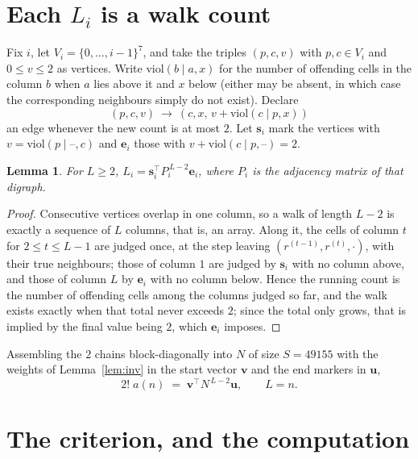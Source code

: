 \documentclass[11pt,a4paper]{article}
\theoremstyle{plain}
\newtheorem{lemma}[theorem]{Lemma}
\theoremstyle{definition}
\begin{document}
\section{Each $L_i$ is a walk count}

Fix $i$, let $V_i=\{0,\dots,i-1\}^{7}$, and take the triples $(p,c,v)$ with
$p,c\in V_i$ and $0\le v\le2$ as vertices. Write $\mathrm{viol}(b\mid a,x)$ for the number
of offending cells in the column $b$ when $a$ lies above it and $x$ below (either may be
absent, in which case the corresponding neighbours simply do not exist). Declare
\[
(p,c,v)\ \longrightarrow\ (c,x,\,v+\mathrm{viol}(c\mid p,x))
\]
an edge whenever the new count is at most $2$. Let $\mathbf{s}_i$ mark the vertices with
$v=\mathrm{viol}(p\mid\text{--},c)$ and $\mathbf{e}_i$ those with
$v+\mathrm{viol}(c\mid p,\text{--})=2$.

\begin{lemma}\label{lem:walk}
For $L\ge2$, $L_i=\mathbf{s}_i^{\!\top}P_i^{\,L-2}\mathbf{e}_i$, where $P_i$ is the
adjacency matrix of that digraph.
\end{lemma}

\begin{proof}
Consecutive vertices overlap in one column, so a walk of length $L-2$ is exactly a sequence
of $L$ columns, that is, an array. Along it, the cells of column $t$ for $2\le t\le L-1$ are
judged once, at the step leaving $(r^{(t-1)},r^{(t)},\cdot)$, with their true neighbours;
those of column $1$ are judged by $\mathbf{s}_i$ with no column above, and those of column
$L$ by $\mathbf{e}_i$ with no column below. Hence the running count is the number of
offending cells among the columns judged so far, and the walk exists exactly when that total
never exceeds $2$; since the total only grows, that is implied by the final value being
$2$, which $\mathbf{e}_i$ imposes.
\end{proof}

Assembling the $2$ chains block-diagonally into $N$ of size $S=49155$ with the weights of
Lemma~\ref{lem:inv} in the start vector $\mathbf{v}$ and the end markers in
$\mathbf{u}$,
\begin{equation}\label{eq:walk2}
2!\;a(n)\;=\;\mathbf{v}^{\!\top}N^{\,L-2}\mathbf{u},\qquad L=n .
\end{equation}

\section{The criterion, and the computation}
\end{document}

